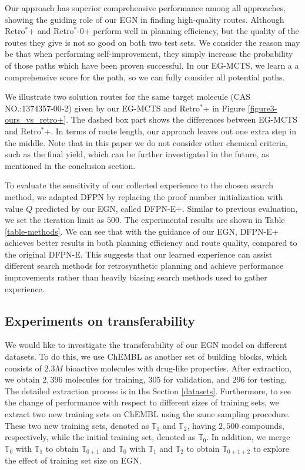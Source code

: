 \documentclass[sn-mathphys,Numbered]{sn-jnl}
\begin{document}
Our approach has superior comprehensive performance among all approaches, showing the guiding role of our EGN in finding high-quality routes.
Although Retro$^*$+ and Retro$^*$-0+ perform well in planning efficiency, but the quality of the routes they give is not so good on both two test sets. 
We consider the reason may be that when performing self-improvement, they simply increase the probability of those paths which have been proven successful. In our EG-MCTS, we learn a a comprehensive score for the path, so we can fully consider all potential paths.

We illustrate two solution routes for the same target molecule (CAS NO.:1374357-00-2) given by our EG-MCTS and Retro$^*$+ in Figure \ref{figure3-ours_vs_retro+}. The dashed box part shows the differences between EG-MCTS and Retro$^*$+. In terms of route length, our approach leaves out one extra step in the middle. Note that in this paper we do not consider other chemical criteria, such as the final yield, which can be further investigated in the future, as mentioned in the conclusion section.

To evaluate the sensitivity of our collected experience to the chosen search method, we adapted DFPN by replacing the proof number initialization with value $Q$ predicted by our EGN, called DFPN-E+. Similar to previous evaluation, we set the iteration limit as $500$. The experimental results are shown in Table \ref{table-methods}. We can see that with the guidance of our EGN, DFPN-E+ achieves better results in both planning efficiency and route quality, compared to the original DFPN-E.
This suggests that our learned experience can assist different search methods for retrosynthetic planning and achieve performance improvements rather than heavily biasing search methods used to gather experience.

\subsection{Experiments on transferability}\label{chembl-exp}
We would like to investigate the transferability of our EGN model on different datasets. 
To do this, we use ChEMBL as another set of building blocks, which consists of $2.3M$ bioactive molecules with drug-like properties.
After extraction, we obtain $2,396$ molecules for training, $305$ for validation, and $296$ for testing.
The detailed extraction process is in the Section \ref{datasets}. 
Furthermore, to see the change of performance with respect to different sizes of training sets, we extract two new training sets on ChEMBL using the same sampling procedure.
These two new training sets, denoted as $\mathbb{T}_1$ and $\mathbb{T}_2$, having $2,500$ compounds, respectively, while the initial training set, denoted as $\mathbb{T}_0$.
In addition, we merge $\mathbb{T}_0$ with $\mathbb{T}_1$ to obtain $\mathbb{T}_{0+1}$ and $\mathbb{T}_0$ with $\mathbb{T}_1$ and $\mathbb{T}_2$ to obtain $\mathbb{T}_{0+1+2}$ to explore the effect of training set size on EGN.
\end{document}
